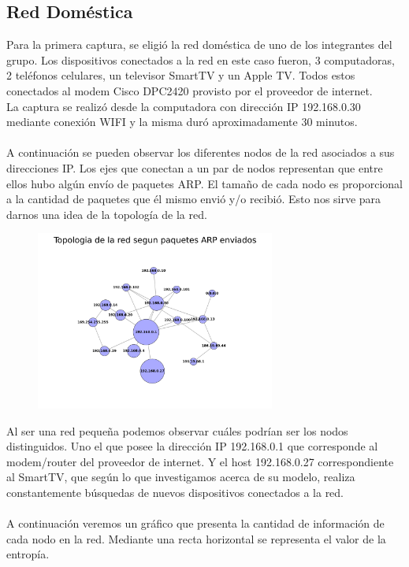 \subsection{Red Doméstica}

Para la primera captura, se eligió la red doméstica de uno de los integrantes del grupo. Los dispositivos conectados a la red en este caso fueron, 3 computadoras, 2 teléfonos celulares, un televisor SmartTV y un Apple TV. Todos estos conectados al modem Cisco DPC2420 provisto por el proveedor de internet.
\\
La captura se realizó desde la computadora con dirección IP 192.168.0.30 mediante conexión WIFI y la misma duró aproximadamente 30 minutos.
\\\\
A continuación se pueden observar los diferentes nodos de la red asociados a sus direcciones IP. Los ejes que conectan a un par de nodos representan que entre ellos hubo algún envío de paquetes ARP. El tamaño de cada nodo es proporcional a la cantidad de paquetes que él mismo envió y/o recibió. Esto nos sirve para darnos una idea de la topología de la red.

\FloatBarrier

\begin{figure}[ht!]
  \centering
   \includegraphics[width=0.7\textwidth]{graficos/domestica_network.png}
  \caption{}
  \label{fig:domestica_network}
\end{figure}

\FloatBarrier

Al ser una red pequeña podemos observar cuáles podrían ser los nodos distinguidos. Uno el que posee la dirección IP 192.168.0.1 que corresponde al modem/router del proveedor de internet. Y el host 192.168.0.27 correspondiente al SmartTV, que según lo que investigamos acerca de su modelo, realiza constantemente búsquedas de nuevos dispositivos conectados a la red.
\\\\
A continuación veremos un gráfico que presenta la cantidad de información de cada nodo en la red. Mediante una recta horizontal se representa el valor de la entropía.

